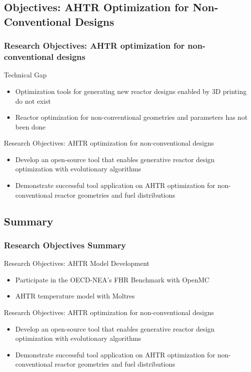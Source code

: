 \subsection{Objectives: AHTR Optimization for Non-Conventional Designs}
\begin{frame}
    \frametitle{Research Objectives: AHTR optimization for non-conventional designs}
    \begin{block}{Technical Gap}
      \begin{itemize}
        \item Optimization tools for generating new reactor designs enabled by
        3D printing do not exist
        \item Reactor optimization for non-conventional geometries and parameters 
        has not been done 
      \end{itemize}
    \end{block}
    \begin{block}{Research Objectives: AHTR optimization for non-conventional designs}
        \begin{itemize}
            \item Develop an open-source tool that enables generative reactor design 
            optimization with evolutionary algorithms 
            \item Demonstrate successful tool application on AHTR optimization for 
            non-conventional reactor geometries and fuel distributions
        \end{itemize}
    \end{block}
  \end{frame}

\subsection{Summary}
\begin{frame}
    \frametitle{Research Objectives Summary}
    \begin{block}{Research Objectives: AHTR Model Development}
        \begin{itemize}
            \item Participate in the OECD-NEA's FHR Benchmark with OpenMC \cite{romano_openmc:_2015}
            \item AHTR temperature model with Moltres \cite{lindsay_moltres_2017}
        \end{itemize}
    \end{block}

    \begin{block}{Research Objectives: AHTR optimization for non-conventional designs}
        \begin{itemize}
            \item Develop an open-source tool that enables generative reactor design 
            optimization with evolutionary algorithms 
            \item Demonstrate successful tool application on AHTR optimization for 
            non-conventional reactor geometries and fuel distributions
        \end{itemize}
    \end{block}
\end{frame}